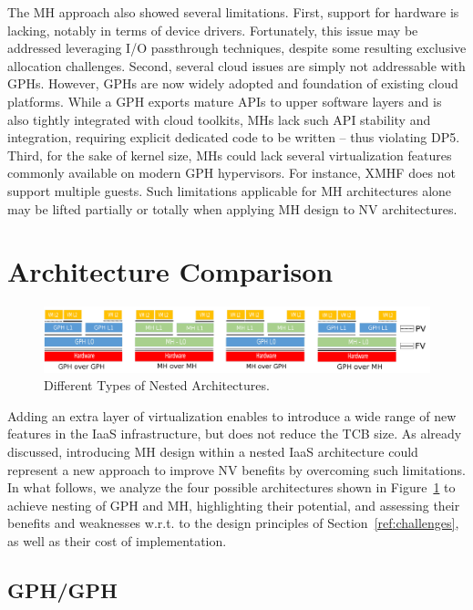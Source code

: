 \documentclass{sig-alternate}
\begin{document}
\noindent The MH approach also showed several limitations. First, support for hardware is lacking, notably in terms of device drivers. Fortunately, this issue may be addressed leveraging I/O passthrough techniques, despite some resulting exclusive allocation challenges.
Second, several cloud issues are simply not addressable with GPHs. However, GPHs are now widely adopted and foundation of existing cloud platforms. While a GPH exports mature APIs to upper software layers and is also tightly integrated with cloud toolkits, MHs lack such API stability and integration, requiring explicit dedicated code to be written -- thus violating DP5.  
Third, for the sake of kernel size, MHs could lack several virtualization features commonly available on modern GPH hypervisors. For instance, XMHF does not support multiple guests. Such limitations applicable for MH architectures alone may be lifted partially or totally when applying MH design to NV architectures. 

\section{Architecture Comparison}
\label{sec:archcomp}

\begin{figure}
\begin{center}
\includegraphics[width=2\columnwidth]{globalcut.png}
\end{center}
\caption{Different Types of Nested Architectures.}
\label{fig:io}
\end{figure}

\noindent Adding an extra layer of virtualization enables to introduce a wide range of new features in the IaaS infrastructure, but does not reduce the TCB size. As already discussed, introducing MH design within a nested IaaS architecture could represent a new approach to improve NV benefits by overcoming such limitations. In what follows, we analyze the four possible architectures shown in Figure~\ref{fig:io} to achieve nesting of GPH and MH, highlighting their potential, and assessing their benefits and weaknesses w.r.t. to the design principles of Section~\ref{ref:challenges}, as well as their cost of implementation.

\subsection{GPH/GPH}
\end{document}
